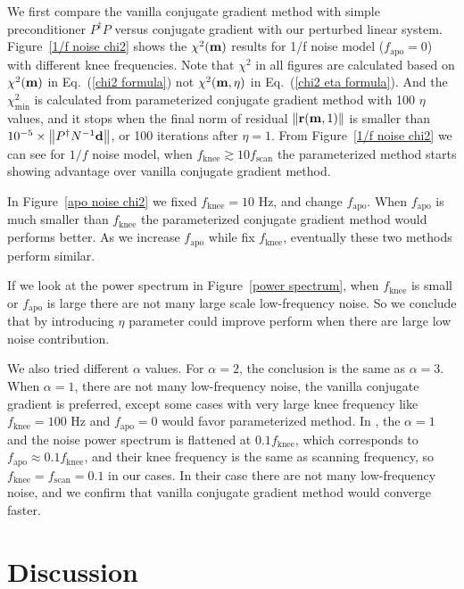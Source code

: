 \documentclass[twocolumn,linenumbers]{aastex631}
\newcommand{\vbd}{\vb{d}}
\newcommand{\vbm}{\vb{m}}
\newcommand{\Pdagger}{P^{\dagger}}
\begin{document}
We first compare the vanilla conjugate gradient method with
simple preconditioner $\Pdagger P$ versus conjugate gradient with our perturbed linear system.
Figure~\ref{1/f noise chi2} shows the $\chi^2(\vbm)$ results for 1/f noise model ($f_\text{apo}=0$)
with different knee frequencies.
Note that $\chi^2$ in all figures are calculated based on $\chi^2(\vbm)$ in Eq.~(\ref{chi2 formula})
not $\chi^2(\vbm, \eta)$ in Eq.~(\ref{chi2 eta formula}).
And the $\chi^2_{\text{min}}$ is calculated from parameterized conjugate gradient
method with 100 $\eta$ values, and it stops when the final norm of residual $\norm{\vb{r}(\vbm,1)}$
is smaller than $10^{-5}\times\norm{\Pdagger N^{-1} \vbd}$, or 100 iterations after $\eta=1$.
From Figure~\ref{1/f noise chi2} we can see for $1/f$ noise model,
when $f_\text{knee} \gtrsim 10 f_\text{scan}$ the parameterized method starts showing advantage
over vanilla conjugate gradient method.


In Figure~\ref{apo noise chi2} we fixed $f_\text{knee}=10$ Hz, and change $f_\text{apo}$.
When $f_\text{apo}$ is much smaller than $f_\text{knee}$ the parameterized conjugate gradient method would
performs better.
As we increase $f_\text{apo}$ while fix $f_\text{knee}$, eventually these two methods perform similar.

If we look at the power spectrum in Figure~\ref{power spectrum},
when $f_\text{knee}$ is small or $f_\text{apo}$ is large there are not many
large scale low-frequency noise.
So we conclude that by introducing $\eta$ parameter could improve perform when there are large low noise
contribution.


We also tried different $\alpha$ values. For $\alpha=2$, the conclusion is the
same as $\alpha=3$. When $\alpha=1$, there are not many low-frequency noise, 
the vanilla conjugate gradient is preferred, except some cases with very large
knee frequency like $f_\text{knee} = 100$ Hz and $f_\text{apo}=0$ would favor
parameterized method.
In \citealt{2018A&A...620A..59P}, the $\alpha = 1$ and  the noise power spectrum is flattened at $0.1f_\text{knee}$,
which corresponds to $f_\text{apo} \approx 0.1 f_\text{knee}$,
and their knee frequency is the same as scanning frequency, so $f_\text{knee}=f_\text{scan}=0.1$ 
in our cases.
In their case there are not many low-frequency noise,
and we confirm that vanilla conjugate gradient method would converge faster.



\section{Discussion} \label{sec:discussion}
\end{document}
